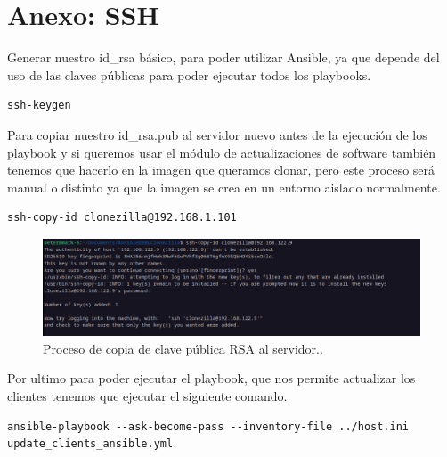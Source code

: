 \newpage
\section{Anexo: SSH}

Generar nuestro id\_rsa básico, para poder utilizar Ansible, ya que depende del uso de las claves públicas para poder ejecutar todos los playbooks.

\begin{lstlisting}[style=mybash]
ssh-keygen
\end{lstlisting}

Para copiar nuestro id\_rsa.pub al servidor nuevo antes de la ejecución de los playbook y si queremos usar el módulo de actualizaciones de software también tenemos que 
hacerlo en la imagen que queramos clonar, pero este proceso será manual o distinto ya que la imagen se crea en un entorno aislado normalmente.

\begin{lstlisting}[style=mybash]
ssh-copy-id clonezilla@192.168.1.101
\end{lstlisting}

\begin{figure}[H]
	\centering
	\includegraphics[scale=0.30]{anexo/copy-id}
	\caption{Proceso de copia de clave pública RSA al servidor..}
\end{figure}
	
Por ultimo para poder ejecutar el playbook, que nos permite actualizar los clientes tenemos que ejecutar el siguiente comando.

\begin{lstlisting}[style=mybash]
ansible-playbook --ask-become-pass --inventory-file ../host.ini update_clients_ansible.yml
\end{lstlisting}







